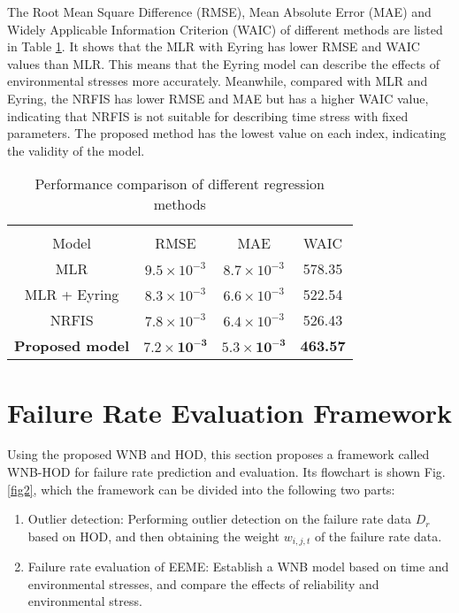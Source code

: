 \documentclass[journal,twoside,web]{ieeecolor}
\begin{document}
The Root Mean Square Difference (RMSE), Mean Absolute Error (MAE) and Widely Applicable Information Criterion (WAIC) of different methods are listed in Table \ref{tabnoliear}. It shows that the MLR with Eyring has lower RMSE and WAIC values than MLR. This means that the Eyring model can describe the effects of environmental stresses more accurately. Meanwhile, compared with MLR and Eyring, the NRFIS has lower RMSE and MAE but has a higher WAIC value, indicating that NRFIS is not suitable for describing time stress with fixed parameters. The proposed method has the lowest value on each index, indicating the validity of the model.

\begin{table}
	\caption{Performance comparison of different regression methods}
	\label{tabnoliear}
	\setlength{\tabcolsep}{7pt}
	\renewcommand\arraystretch{1.2}
	\begin{center}
		\begin{tabular}{c c c c}	
			\hline\hline \\[-3mm]
			\multicolumn{1}{c}{Model} &  \multicolumn{1}{c}{RMSE} &  \multicolumn{1}{c}{MAE} &  \multicolumn{1}{c}{WAIC} \\ 
			\hline
			MLR    						& $ 9.5\times10^{-3} $  & $ 8.7\times10^{-3} $       & 578.35              \\
			MLR + Eyring    			& $ 8.3\times10^{-3} $  & $ 6.6\times10^{-3} $       & 522.54              \\	
			NRFIS    					& $ 7.8\times10^{-3} $  & $ 6.4\times10^{-3} $       & 526.43               \\
			\textbf{Proposed model}	& $ \bm{7.2\times10^{-3}} $ & $ \bm{5.3\times10^{-3}} $  & \textbf{463.57}               \\
			\hline\hline
		\end{tabular}
	\end{center}
\end{table}





\section{Failure Rate Evaluation Framework}
Using the proposed WNB and HOD, this section proposes a framework called WNB-HOD for failure rate prediction and evaluation. Its flowchart is shown Fig. \ref{fig2}, which the framework can be divided into the following two parts:
\begin{enumerate}
	\item Outlier detection: Performing outlier detection on the failure rate data $ D_{r} $ based on HOD, and then obtaining the weight $ w_{i,j,t} $ of the failure rate data.
	\item Failure rate evaluation of EEME: Establish a WNB model based on time and environmental stresses, and compare the effects of reliability and environmental stress.
\end{enumerate}
\end{document}
